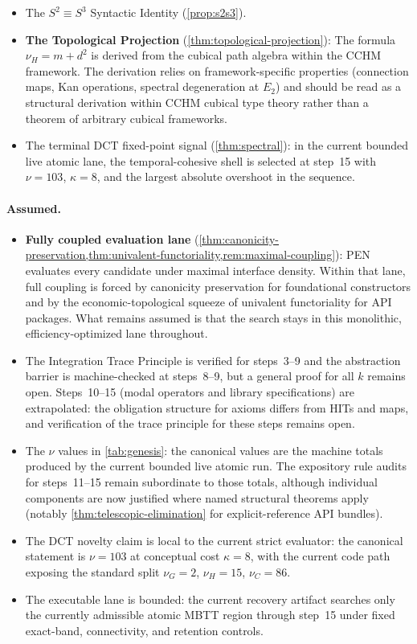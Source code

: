 \documentclass[11pt,a4paper]{article}
\theoremstyle{plain}
\theoremstyle{definition}
\theoremstyle{remark}
\begin{document}
\begin{itemize}[nosep]
    \item The $S^2 \equiv S^3$ Syntactic Identity (\cref{prop:s2s3}).
    \item \textbf{The Topological Projection} (\cref{thm:topological-projection}): The formula $\nu_H = m + d^2$ is derived from the cubical path algebra within the CCHM framework.  The derivation relies on framework-specific properties (connection maps, Kan operations, spectral degeneration at $E_2$) and should be read as a structural derivation within CCHM cubical type theory rather than a theorem of arbitrary cubical frameworks.
    \item The terminal DCT fixed-point signal (\cref{thm:spectral}): in the current bounded live atomic lane, the temporal-cohesive shell is selected at step~15 with $\nu=103$, $\kappa=8$, and the largest absolute overshoot in the sequence.
\end{itemize}

\paragraph{Assumed.}
\begin{itemize}[nosep]
    \item \textbf{Fully coupled evaluation lane} (\cref{thm:canonicity-preservation,thm:univalent-functoriality,rem:maximal-coupling}): PEN evaluates every candidate under maximal interface density. Within that lane, full coupling is forced by canonicity preservation for foundational constructors and by the economic-topological squeeze of univalent functoriality for API packages. What remains assumed is that the search stays in this monolithic, efficiency-optimized lane throughout.
    \item The Integration Trace Principle is verified for steps~3--9 and the abstraction barrier is machine-checked at steps~8--9, but a general proof for all $k$ remains open.  Steps~10--15 (modal operators and library specifications) are extrapolated: the obligation structure for axioms differs from HITs and maps, and verification of the trace principle for these steps remains open.
    \item The $\nu$ values in \cref{tab:genesis}: the canonical values are the machine totals produced by the current bounded live atomic run.  The expository rule audits for steps~11--15 remain subordinate to those totals, although individual components are now justified where named structural theorems apply (notably \cref{thm:telescopic-elimination} for explicit-reference API bundles).
    \item The DCT novelty claim is local to the current strict evaluator: the canonical statement is $\nu=103$ at conceptual cost $\kappa=8$, with the current code path exposing the standard split $\nu_G=2$, $\nu_H=15$, $\nu_C=86$.
    \item The executable lane is bounded: the current recovery artifact searches only the currently admissible atomic MBTT region through step~15 under fixed exact-band, connectivity, and retention controls.
\end{itemize}
\end{document}
